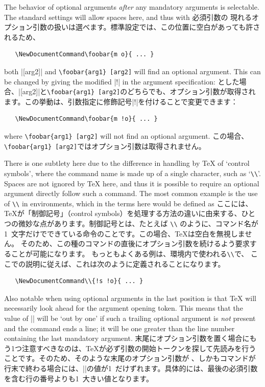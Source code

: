 \documentclass{ltxguide}
\newcommand\jpnewline{\vspace{3pt}\newline}
\DeclareRobustCommand{\jpemph}[1]{%
  \underLine{#1}%
}
\begin{document}
The behavior of optional arguments \emph{after} any mandatory arguments is
selectable. The standard settings will allow spaces here, and thus with
\jpnewline
必須引数の\jpemph{後に}現れるオプション引数の扱いは選べます。標準設定では、この位置に空白があっても許されるため、
\begin{verbatim}
   \NewDocumentCommand\foobar{m o}{ ... }
\end{verbatim}
both |[arg2]| and \verb*|\foobar{arg1} [arg2]| will find an
optional argument. This can be changed by giving the modified |!| in the
argument specification:
\jpnewline
とした場合、|[arg2]|と\verb*|\foobar{arg1} [arg2]|のどちらでも、オプション引数が取得されます。この挙動は、引数指定に修飾記号|!|を付けることで変更できます：
\begin{verbatim}
   \NewDocumentCommand\foobar{m !o}{ ... }
\end{verbatim}
where \verb*|\foobar{arg1} [arg2]| will not find an optional argument.
\jpnewline
この場合、\verb*|\foobar{arg1} [arg2]|ではオプション引数は取得されません。

There is one subtlety here due to the difference in handling by \TeX{} of
`control symbols', where the command name is made up of a single
character, such as `\texttt{\textbackslash\textbackslash}'.
Spaces are not ignored by \TeX{} here,
and thus it is possible to require an optional argument directly follow such a
command. The most common example is the use of \texttt{\textbackslash\textbackslash}
in  environments, which in the terms here would be defined as
\jpnewline
ここには、\TeX{}が「制御記号」（control symbols）を処理する方法の違いに由来する、ひとつの微妙な点があります。制御記号とは、たとえば \texttt{\textbackslash\textbackslash} のように、コマンド名が1~文字だけでできている命令のことです。この場合、\TeX{}は空白を無視しません。
そのため、この種のコマンドの直後にオプション引数を続けるよう要求することが可能になります。
もっともよくある例は、環境内で使われる\texttt{\textbackslash\textbackslash}で、
ここでの説明に従えば、これは次のように定義されることになります。
\begin{verbatim}
   \NewDocumentCommand\\{!s !o}{ ... }
\end{verbatim}


Also notable when using optional arguments in the last position is that \TeX{}
will necessarily look ahead for the argument opening token. This means that
the value of || will be `out by one' if such a trailing optional
argument is \emph{not} present and the command ends a line; it will be one
greater than the line number containing the last mandatory argument.
\jpnewline
末尾にオプション引数を置く場合にもう1つ注意すべきなのは、\TeX{}が必ず引数の開始トークンを探して先読みを行うことです。そのため、そのような末尾のオプション引数が\jpemph{存在せず}、しかもコマンドが行末で終わる場合には、||の値が1~だけずれます。具体的には、最後の必須引数を含む行の番号よりも1~大きい値となります。
\end{document}
